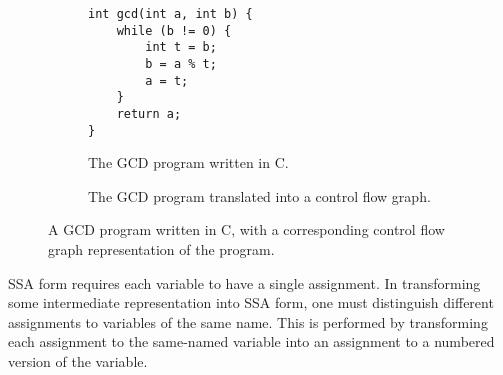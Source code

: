 \begin{figure}[ht]
  \centering
  \begin{subfigure}[b]{0.33\textwidth}
    \centering 
\begin{lstlisting}
int gcd(int a, int b) {
    while (b != 0) {
        int t = b;
        b = a % t;
        a = t;
    }
    return a;
}
\end{lstlisting}
    \caption{The GCD program written in C.}
  \end{subfigure}%
  \hspace{1em}
  \begin{subfigure}[b]{0.57 \textwidth}
    \centering
    \caption{The GCD program translated into a control flow graph.}
  \end{subfigure}
  \caption[A GCD program written in C, with a corresponding control flow graph representation of the program.]{A GCD program written in C, with a corresponding control flow graph representation of the program.~\cite{gange2015horn}}
  \label{fig:lit-review--gcd-control-flow-graph}
\end{figure}

SSA form requires each variable to have a single assignment. In transforming some intermediate representation into SSA form, one must distinguish different assignments to variables of the same name. This is performed by transforming each assignment to the same-named variable into an assignment to a numbered version of the variable. 


